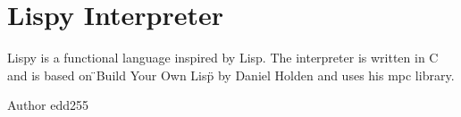 \chapter{Lispy Interpreter}
\hypertarget{index}{}\label{index}
Lispy is a functional language inspired by Lisp. The interpreter is written in C and is based on \"{}\+Build Your Own Lisp\"{} by Daniel Holden and uses his mpc library.

\begin{DoxyAuthor}{Author}
edd255 
\end{DoxyAuthor}
